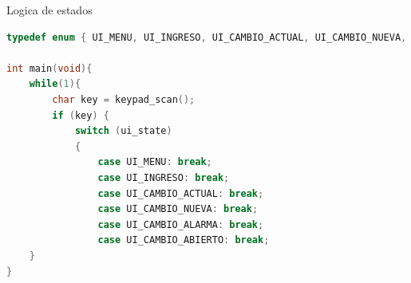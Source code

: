 Logica de estados
\begin{lstlisting}[language=C, caption={Logica de estados}]
typedef enum { UI_MENU, UI_INGRESO, UI_CAMBIO_ACTUAL, UI_CAMBIO_NUEVA, UI_ABIERTO, UI_ALARMA } ui_state_t;

int main(void){
    while(1){
        char key = keypad_scan();
		if (key) {
			switch (ui_state)
			{
                case UI_MENU: break;
                case UI_INGRESO: break;
                case UI_CAMBIO_ACTUAL: break;
                case UI_CAMBIO_NUEVA: break;
                case UI_CAMBIO_ALARMA: break;
                case UI_CAMBIO_ABIERTO: break;
    }
}
\end{lstlisting}



